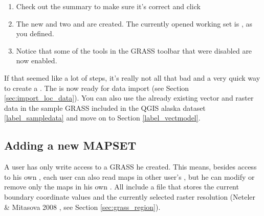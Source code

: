 \begin{enumerate}
  \footnote{When creating a new , GRASS automatically 
  creates a special  called  designed to 
  store the core data for the project, its default spatial extend and 
  coordinate system definitions (Neteler \& Mitasova 2008 
  \cite{neteler_mitasova08}).}
  \item Check out the summary to make sure it's correct and click
  \item The new  and two 
  and  are created. The currently opened working set is
  , as you defined.
  \item Notice that some of the tools in the GRASS toolbar that were 
  disabled are now enabled.
\end{enumerate}

If that seemed like a lot of steps, it's really not all that bad and a very 
quick way to create a . The  is 
now ready for data import (see Section \ref{sec:import_loc_data}).
You can also use the already existing vector and raster data in the sample 
GRASS  included in the QGIS alaska dataset 
\ref{label_sampledata} and move on to Section \ref{label_vectmodel}.

\subsection{Adding a new MAPSET}\label{sec:add_mapset}

A user has only write access to a GRASS  he created. This 
means, besides access to his own , each user can also read 
maps in other user's , but he can modify or remove only 
the maps in his own . All  include a 
 file that stores the current boundary coordinate values and 
the currently selected raster resolution (Neteler \& Mitasova 2008 
\cite{neteler_mitasova08}, see Section \ref{sec:grass_region}). 


